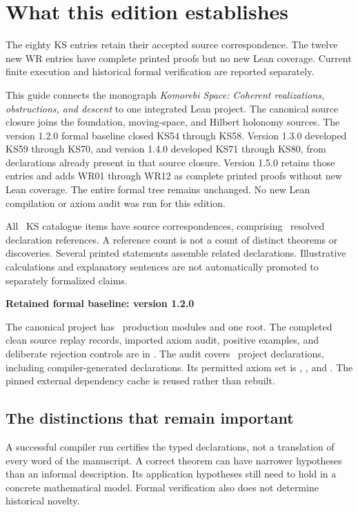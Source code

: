 \documentclass[11pt]{article}
\begin{document}
\KomorebiCover
\section*{What this edition establishes}
The eighty KS entries retain their accepted source correspondence. The twelve new WR entries have complete printed proofs but no new Lean coverage. Current finite execution and historical formal verification are reported separately.

This guide connects the monograph \emph{Komorebi Space: Coherent realizations, obstructions, and descent} to one integrated Lean project. The canonical source closure joins the foundation, moving-space, and Hilbert holonomy sources. The version 1.2.0 formal baseline closed KS54 through KS58. Version 1.3.0 developed KS59 through KS70, and version 1.4.0 developed KS71 through KS80, from declarations already present in that source closure. Version 1.5.0 retains those entries and adds WR01 through WR12 as complete printed proofs without new Lean coverage. The entire formal tree remains unchanged. No new Lean compilation or axiom audit was run for this edition.

All \EditionClaims\ KS catalogue items have source correspondences, comprising \EditionReferences\ resolved declaration references. A reference count is not a count of distinct theorems or discoveries. Several printed statements assemble related declarations. Illustrative calculations and explanatory sentences are not automatically promoted to separately formalized claims.

\begin{scopebox}
\textbf{Retained formal baseline: version 1.2.0}\par
The canonical project has \EditionFormalModules\ production modules and one root. The completed clean source replay records, imported axiom audit, positive examples, and deliberate rejection controls are in . The audit covers \EditionAuditedDeclarations\ project declarations, including compiler-generated declarations. Its permitted axiom set is , , and . The pinned external dependency cache is reused rather than rebuilt.
\end{scopebox}

\subsection*{The distinctions that remain important}
A successful compiler run certifies the typed declarations, not a translation of every word of the manuscript. A correct theorem can have narrower hypotheses than an informal description. Its application hypotheses still need to hold in a concrete mathematical model. Formal verification also does not determine historical novelty.
\end{document}
